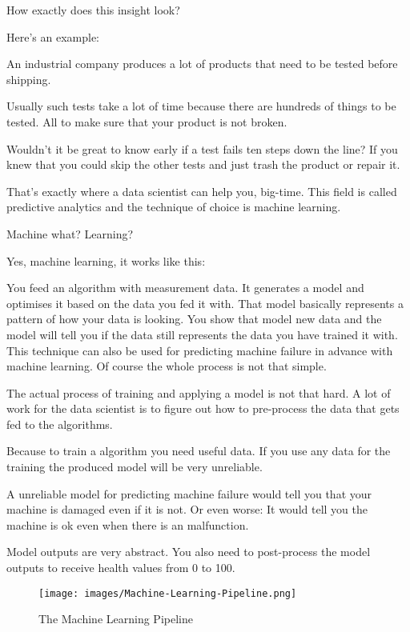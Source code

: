 \documentclass[12pt, numbers=noenddot]{scrreprt} %
\begin{document}
How exactly does this insight look?

Here’s an example:

An industrial company produces a lot of products that need to be tested before shipping.

Usually such tests take a lot of time because there are hundreds of things to be tested. All to make sure that your product is not broken.

Wouldn’t it be great to know early if a test fails ten steps down the line? If you knew that you could skip the other tests and just trash the product or repair it.

That’s exactly where a data scientist can help you, big-time. This field is called predictive analytics and the technique of choice is machine learning.

Machine what? Learning?

Yes, machine learning, it works like this:

You feed an algorithm with measurement data.
It generates a model and optimises it based on the data you fed it with. That model basically represents a pattern of how your data is looking. 
You show that model new data and the model will tell you if the data still represents the data you have trained it with.
This technique can also be used for predicting machine failure in advance with machine learning. Of course the whole process is not that simple.

The actual process of training and applying a model is not that hard. A lot of work for the data scientist is to figure out how to pre-process the data that gets fed to the algorithms.

Because to train a algorithm you need useful data. If you use any data for the training the produced model will be very unreliable.

A unreliable model for predicting machine failure would tell you that your machine is damaged even if it is not. Or even worse: It would tell you the machine is ok even when there is an malfunction.

Model outputs are very abstract. You also need to post-process the model outputs to receive health values from 0 to 100.

\begin{figure}[htbp]
  \centering
     \texttt{[image: images/Machine-Learning-Pipeline.png]}
  \caption{The Machine Learning Pipeline}
  \label{fig:Bild1}
\end{figure}
\end{document}
